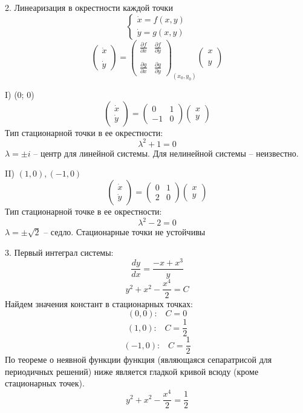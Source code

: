 \documentclass[10pt]{report}
\begin{document}
2. Линеаризация в окрестности каждой точки
\[\left\{
\begin{array}{lr}
\dot{x}=f(x,y)\\
\dot{y}=g(x,y)
\end{array}
\right.\]
\[\left(
\begin{array}{c}
\dot{x}\\\\
\dot{y}
\end{array}\right)=
\left(
\begin{array}{cc}
\frac{\partial f}{\partial x} & \frac{\partial f}{\partial y} \\\\
\frac{\partial g}{\partial x} & \frac{\partial g}{\partial y}
\end{array}\right) _{(x_0, y_0)}
\left(
\begin{array}{c}
x\\\\
y
\end{array}\right)\]

I) (0; 0)
\[\left(
\begin{array}{c}
\dot{x}\\
\dot{y}
\end{array}\right)=
\left(
\begin{array}{cc}
0 & 1 \\
-1 & 0
\end{array}\right) 
\left(
\begin{array}{c}
x\\
y
\end{array}\right)\]
Тип стационарной точки в ее окрестности:
\[\lambda^2+1=0\]
$\lambda=\pm i$ -- центр для линейной системы. Для нелинейной системы -- неизвестно.

II) $(1, 0), (-1, 0)$
\[\left(
\begin{array}{c}
\dot{x}\\
\dot{y}
\end{array}\right)=
\left(
\begin{array}{cc}
0 & 1 \\
2 & 0
\end{array}\right) 
\left(
\begin{array}{c}
x\\
y
\end{array}\right)\]
Тип стационарной точке в ее окрестности:
\[\lambda^2-2=0\]
$\lambda=\pm \sqrt{2}$ -- седло. Стационарные точки не устойчивы

3. Первый интеграл системы:
\[ \frac {dy} {dx} = \frac {-x+x^3} {y}\]
\[ y^2+x^2- \frac {x^4} 2 = C\]
Найдем значения констант в стационарных точках:
\[ (0,0): \;\;\; C=0\]
\[ (1, 0): \;\;\; C= \frac 1 2 \]
\[ (-1, 0): \;\;\; C= \frac 1 2 \]
По теореме о неявной функции функция (являющаяся сепаратрисой для периодичных решений) ниже является гладкой кривой всюду (кроме стационарных точек). 
\[ y^2+x^2- \frac {x^4} 2 = \frac 1 2\]
\end{document}

